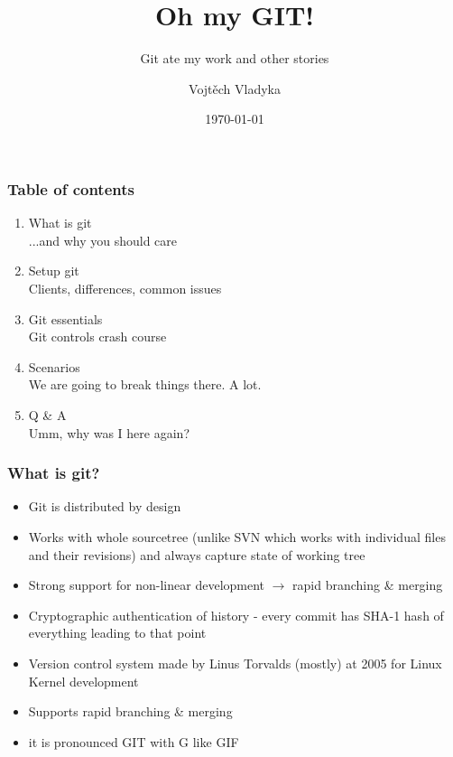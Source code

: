 \documentclass[aspectratio=169]{beamer}
\title{Oh my GIT!}
\subtitle{Git ate my work and other stories}
\author{Vojtěch Vladyka}
\date{\today}
\begin{document}
    \frame{\titlepage}
    \begin{frame}
       \frametitle{Table of contents}
       \begin{enumerate}
           \item What is git
           \\   \textcolor{solarizedRebase01}{\footnotesize\hspace{1em} ...and why you should care}	
           \item Setup git
           \\   \textcolor{solarizedRebase01}{\footnotesize\hspace{1em} Clients, differences, common issues}	
           \item Git essentials
           \\   \textcolor{solarizedRebase01}{\footnotesize\hspace{1em} Git controls crash course}	
           \item Scenarios
           \\   \textcolor{solarizedRebase01}{\footnotesize\hspace{1em} We are going to break things there. A lot.}	
           \item Q \& A
           \\   \textcolor{solarizedRebase01}{\footnotesize\hspace{1em} Umm, why was I here again?}
       \end{enumerate}
    \end{frame}

    \begin{frame}
        \frametitle{What is git?}
        \begin{itemize}
            \item Git is distributed by design
            \item Works with whole sourcetree (unlike SVN which works with individual files and their revisions) and always capture state of working tree
            \item Strong support for non-linear development $\rightarrow$ rapid branching \& merging
            \item Cryptographic authentication of history - every commit has SHA-1 hash of everything leading to that point
            \item Version control system made by Linus Torvalds (mostly) at 2005 for Linux Kernel development
            \item Supports rapid branching \& merging
            \item it is pronounced GIT with G like GIF ~
        \end{itemize}
    \end{frame}
\end{document}
